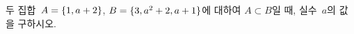 두 집합~$A=\{1{,}\mkern3mu\mathopen{}a+2\}$, $B=\{3{,}\mkern3mu\mathopen{}a^2+2{,}\mkern3mu\mathopen{}a+1\}$에 대하여 $A\subset B$일 때, 실수~$a$의 값을 구하시오.
